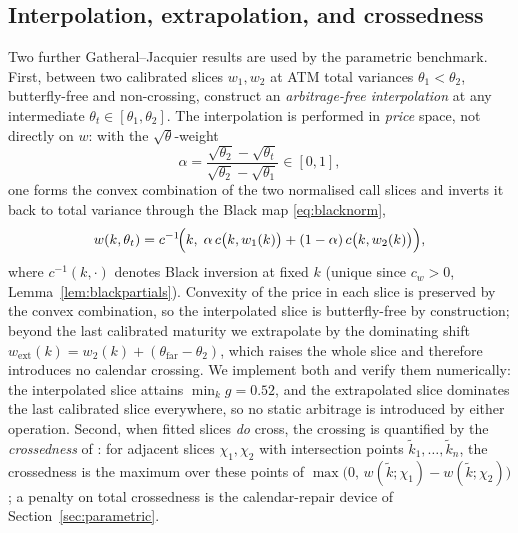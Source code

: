 \subsection{Interpolation, extrapolation, and crossedness}
Two further Gatheral--Jacquier results are used by the parametric benchmark. First, between two
calibrated slices $w_1,w_2$ at ATM total variances $\theta_1<\theta_2$, butterfly-free and
non-crossing, \cite[Lem.~5.1]{gatheraljacquier2014} construct an \emph{arbitrage-free
interpolation} at any intermediate $\theta_t\in[\theta_1,\theta_2]$. The interpolation is
performed in \emph{price} space, not directly on $w$: with the $\sqrt{\theta}$-weight
\begin{equation}\label{eq:interp}
\alpha=\frac{\sqrt{\theta_2}-\sqrt{\theta_t}}{\sqrt{\theta_2}-\sqrt{\theta_1}}\in[0,1],
\end{equation}
one forms the convex combination of the two normalised call slices and inverts it back to total
variance through the Black map \eqref{eq:blacknorm},
\begin{equation}\label{eq:interp2}
w(k,\theta_t)=c^{-1}\!\Bigl(k,\;\alpha\,c\bigl(k,w_1(k)\bigr)+(1-\alpha)\,c\bigl(k,w_2(k)\bigr)\Bigr),
\end{equation}
where $c^{-1}(k,\cdot)$ denotes Black inversion at fixed $k$ (unique since $c_w>0$,
Lemma~\ref{lem:blackpartials}). Convexity of the price in each slice is preserved by the convex
combination, so the interpolated slice is butterfly-free by construction; beyond the last
calibrated maturity we extrapolate by the dominating shift $w_{\mathrm{ext}}(k)=w_2(k)+(\theta_{\mathrm{far}}-\theta_2)$,
which raises the whole slice and therefore introduces no calendar crossing. We implement both and
verify them numerically: the interpolated slice attains $\min_k g=0.52$, and the extrapolated
slice dominates the last calibrated slice everywhere, so no static arbitrage is introduced by
either operation. Second, when fitted slices \emph{do} cross, the crossing is quantified by the
\emph{crossedness} of \cite[Def.~5.1]{gatheraljacquier2014}: for adjacent slices $\chi_1,\chi_2$
with intersection points $\tilde k_1,\dots,\tilde k_n$, the crossedness is the maximum over these
points of $\max\bigl(0,\,w(\tilde k;\chi_1)-w(\tilde k;\chi_2)\bigr)$; a penalty on total
crossedness is the calendar-repair device of Section~\ref{sec:parametric}.

